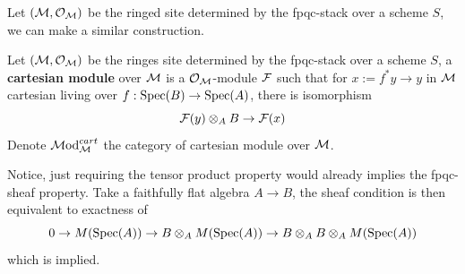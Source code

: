 Let $(\mathcal{M}, \mathcal{O}_{\mathcal{M}})$ be the ringed site determined by the fpqc-stack over a scheme $S$, we can make a similar construction.
\begin{definition}
    Let $(\mathcal{M}, \mathcal{O}_{\mathcal{M}})$ be the ringes site determined by the fpqc-stack over a scheme $S$, a \textbf{cartesian module} over $\mathcal{M}$ is a $\mathcal{O}_{\mathcal{M}}$-module $\mathcal{F}$
    such that for $x:=f^*y\to y$ in $\mathcal{M}$ cartesian living over $f:\operatorname{\mathrm{Spec}}(B)\to \operatorname{\mathrm{Spec}}(A)$, there is isomorphism
    \[
        \mathcal{F}(y)\otimes_A B \to \mathcal{F}(x)
    \]Denote $\operatorname{\mathcal{M}od}^{cart}_{\mathcal{M}}$ the category of cartesian module over $\mathcal{M}$.
\end{definition}

Notice, just requiring the tensor product property would already implies the fpqc-sheaf property. Take a faithfully flat algebra $A\to B$, the sheaf condition is then equivalent to exactness of 
\[
0 \to M(\operatorname{\mathrm{Spec}}(A)) \to B\otimes_A M(\operatorname{\mathrm{Spec}}(A)) \to B\otimes_AB\otimes _A M(\operatorname{\mathrm{Spec}}(A))
\]which is implied.

